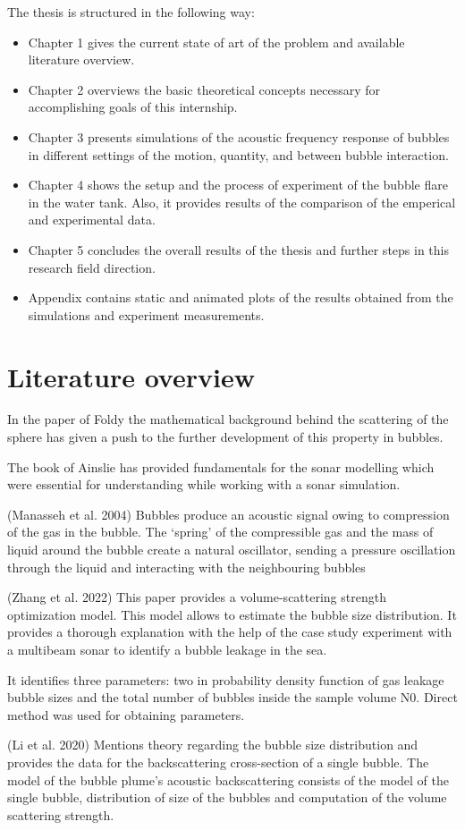 The thesis is structured in the following way:
\begin{itemize}
    \item Chapter 1 gives the current state of art of the problem and available literature overview.
    \item Chapter 2 overviews the basic theoretical concepts necessary for accomplishing goals of this internship.
    \item Chapter 3 presents simulations of the acoustic frequency response of bubbles in different settings of the motion, quantity, and between bubble interaction. 
    \item Chapter 4 shows the setup and the process of experiment of the bubble flare in the water tank. Also, it provides results of the comparison of the emperical and experimental data.
    \item Chapter 5 concludes the overall results of the thesis and further steps in this research field direction.
    \item Appendix contains static and animated plots of the results obtained from the simulations and experiment measurements.  
\end{itemize}

\section{Literature overview} 

In the paper of Foldy the mathematical background behind the scattering of the sphere has given a push to the further development of this property in bubbles.

The book of Ainslie has provided fundamentals for the sonar modelling which were essential for understanding while working with a sonar simulation. 




(Manasseh et al. 2004\cite{manasseh_anisotropy_2004}) Bubbles produce an acoustic signal owing to compression of the gas in the bubble. The ‘spring’ of the compressible gas and the mass of liquid around the bubble create a natural oscillator, sending a pressure oscillation through the liquid and interacting with the neighbouring bubbles

(Zhang et al. 2022\cite{zhang_efficient_2022}) This paper provides a volume-scattering strength optimization model. This model allows to estimate the bubble size distribution. It provides a thorough explanation with the help of the case study experiment with a multibeam sonar to identify a bubble leakage in the sea.

It identifies three parameters: two in probability density function of gas leakage bubble sizes and the total number of bubbles inside the sample volume N0. Direct method was used for obtaining parameters.

(Li et al. 2020\cite{li_broadband_2020}) Mentions theory regarding the bubble size distribution and provides the data for the backscattering cross-section of a single bubble. The model of the bubble plume’s acoustic backscattering consists of the model of the single bubble, distribution of size of the bubbles and computation of the volume scattering strength.

